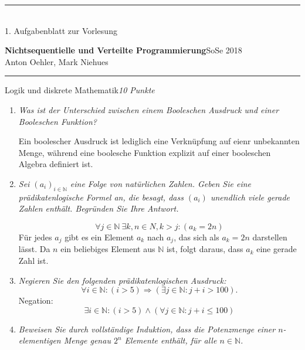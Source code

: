 \documentclass[a4paper,twoside,12pt]{article}
\newcommand{\ZETTELNUMMER}{1}
\newcounter{AUFGNR}
\newcommand{\AUFGABE}[2]{\vspace{0.3cm}\item[Aufgabe~\arabic{AUFGNR}]\stepcounter{AUFGNR} #1\hfill\emph{#2}}
\newcommand{\N}{\mathbb{N}}
\begin{document}
\pagestyle{empty}
\hrule\medskip
\rule{0ex}{0ex}\\[-1ex]
\ZETTELNUMMER. Aufgabenblatt zur Vorlesung

\smallskip
\noindent
\large
\textbf{Nichtsequentielle und Verteilte Programmierung}\hfill SoSe
2018 \\[0.5ex]
\normalsize
Anton Oehler, Mark Niehues

\medskip\hrule

\begin{description}
\AUFGABE{Logik und diskrete Mathematik}{10 Punkte}

\begin{enumerate}
\item \emph{Was ist der Unterschied zwischen einem Booleschen
  Ausdruck und einer Booleschen Funktion?}

  Ein boolescher Ausdruck ist lediglich eine Verkn\"upfung auf eienr unbekannten
  Menge, w\"ahrend eine boolesche Funktion explizit  auf einer booleschen Algebra
  definiert ist.
\item \emph{Sei $(a_i)_{i \in \N}$ eine Folge von nat\"urlichen Zahlen.
  Geben Sie eine pr\"adikatenlogische Formel an, die besagt,
  dass $(a_i)$ unendlich viele gerade Zahlen enth\"alt.
  Begr\"unden Sie Ihre Antwort.}

  \[
    \forall j \in \N \: \exists k,n \in N, k > j: (a_k = 2n)
  \]
  F\"ur jedes $a_j$ gibt es ein Element $a_k$ nach $a_j$, das sich als
  $a_k = 2n$ darstellen l\"asst. Da $n$ ein beliebiges Element aus $\N$ ist,
  folgt daraus, dass $a_k$ eine gerade Zahl ist.
\item \emph{Negieren Sie den folgenden pr\"adikatenlogischen
  Ausdruck:}
    \[
      \forall i \in \N: (i > 5) \Rightarrow (\exists j \in \N: j + i > 100).
    \]
  Negation:
    \[
      \exists i \in \N: (i > 5) \wedge (\forall j \in \N : j + i \leq 100)
    \]
\item \emph{Beweisen Sie durch vollst\"andige Induktion, dass die Potenzmenge
  einer $n$-elementigen Menge genau $2^n$ Elemente enth\"alt, f\"ur alle
  $n \in \N$.}


\end{enumerate}
\end{description}
\end{document}
